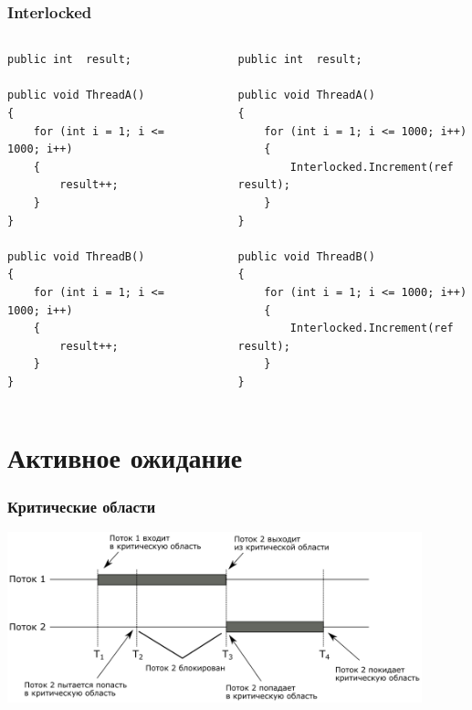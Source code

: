 \documentclass{../../slides-style}
\begin{document}
    \begin{frame}[fragile]
        \frametitle{Interlocked}
        \begin{small}
            \begin{columns}
                \begin{column}{0.4\textwidth}
                    \begin{verbatim}
public int  result;

public void ThreadA()
{
    for (int i = 1; i <= 1000; i++) 
    {
        result++;
    }
}

public void ThreadB()
{
    for (int i = 1; i <= 1000; i++) 
    {
        result++; 
    }
}
                    \end{verbatim}
                \end{column}
                \begin{column}{0.05\textwidth}
                    \rule{0.1mm}{0.8\textheight}
                \end{column}
                \begin{column}{0.5\textwidth}
                    \begin{verbatim}
public int  result;

public void ThreadA()
{
    for (int i = 1; i <= 1000; i++) 
    {
        Interlocked.Increment(ref result);
    }
}

public void ThreadB()
{
    for (int i = 1; i <= 1000; i++) 
    {
        Interlocked.Increment(ref result); 
    }
}
                    \end{verbatim}
                \end{column}
            \end{columns}
        \end{small}
    \end{frame}

    \section{Активное ожидание}

    \begin{frame}
        \frametitle{Критические области}
        \begin{center}
            \includegraphics[width=0.9\textwidth]{criticalSections.png}
        \end{center}
    \end{frame}
\end{document}
